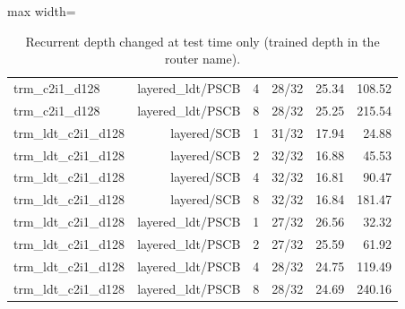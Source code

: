 \begin{table}[t]
\begin{adjustbox}{max width=\linewidth}
\begin{tabular}{lrrrrr}
trm\_c2i1\_d128 & layered\_ldt/PSCB & 4 & 28/32 & 25.34 & 108.52 \\
trm\_c2i1\_d128 & layered\_ldt/PSCB & 8 & 28/32 & 25.25 & 215.54 \\
trm\_ldt\_c2i1\_d128 & layered/SCB & 1 & 31/32 & 17.94 & 24.88 \\
trm\_ldt\_c2i1\_d128 & layered/SCB & 2 & 32/32 & 16.88 & 45.53 \\
trm\_ldt\_c2i1\_d128 & layered/SCB & 4 & 32/32 & 16.81 & 90.47 \\
trm\_ldt\_c2i1\_d128 & layered/SCB & 8 & 32/32 & 16.84 & 181.47 \\
trm\_ldt\_c2i1\_d128 & layered\_ldt/PSCB & 1 & 27/32 & 26.56 & 32.32 \\
trm\_ldt\_c2i1\_d128 & layered\_ldt/PSCB & 2 & 27/32 & 25.59 & 61.92 \\
trm\_ldt\_c2i1\_d128 & layered\_ldt/PSCB & 4 & 28/32 & 24.75 & 119.49 \\
trm\_ldt\_c2i1\_d128 & layered\_ldt/PSCB & 8 & 28/32 & 24.69 & 240.16 \\
\bottomrule
\end{tabular}
\end{adjustbox}
\caption{Recurrent depth changed at test time only (trained depth in the router name).}
\label{tab:mcp02-pilot_gpu-depth}
\end{table}
